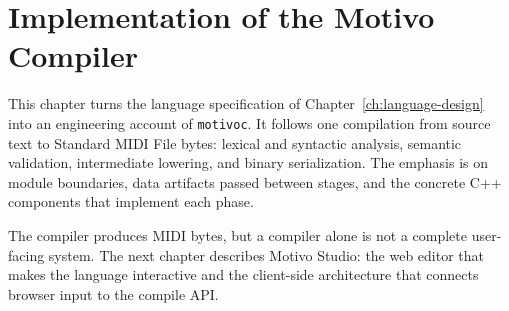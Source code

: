 \chapter{Implementation of the Motivo Compiler}\label{ch:compiler-implementation}

This chapter turns the language specification of Chapter~\ref{ch:language-design} into an engineering account of
\texttt{motivoc}.
It follows one compilation from source text to Standard MIDI File bytes: lexical and syntactic analysis, semantic
validation, intermediate lowering, and binary serialization.
The emphasis is on module boundaries, data artifacts passed between stages, and the concrete C++ components that
implement each phase.







The compiler produces MIDI bytes, but a compiler alone is not a complete user-facing system.
The next chapter describes Motivo Studio: the web editor that makes the language interactive and the client-side
architecture that connects browser input to the compile API.
